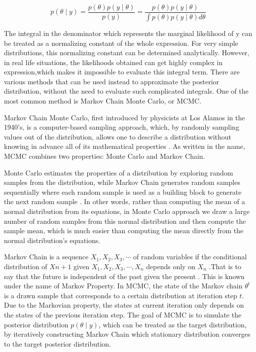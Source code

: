 \documentclass{usiinftr}
\begin{document}
\begin{equation} \label{Bayes}
p(\theta \mid y) = \frac{p(\theta)p(y \mid \theta)}{p(y)} = \frac{p(\theta)p(y \mid \theta)}{\int p(\theta)p(y \mid \theta) d\theta}
\end{equation}

The integral in the denominator which represents the marginal likelihood of y can be treated as a normalizing constant of the whole expression. For very simple distributions, this normalizing constant can be determined analytically. However, in real life situations, the likelihoods obtained can get highly complex in expression,which makes it impossible to evaluate this integral term. There are various methods that can be used instead to approximate the posterior distribution, without the need to evaluate such complicated integrals. One of the most common method is Markov Chain Monte Carlo, or MCMC.

Markov Chain Monte Carlo, first introduced by physicists at Los Alamos in the 1940's, is a computer-based sampling approach, which, by randomly sampling values out of the distribution, allows one to describe a distribution without knowing in advance all of its mathematical properties \cite{20}. As written in the name, MCMC combines two properties: Monte Carlo and Markov Chain. 

Monte Carlo estimates the properties of a distribution by exploring random samples from the distribution, while Markov Chain generates random samples sequentially where each random sample is used as a building block to generate the next random sample \cite{20}. In other words, rather than computing the mean of a normal distribution from its equations, in Monte Carlo approach we draw a large number of random samples from this normal distribution and then compute the sample mean, which is much easier than computing the mean directly from the normal distribution's equations.

Markov Chain is a sequence $X_1,X_2, X_3, \cdots$ of random variables if the conditional distribution of $X{n+1}$ given $X_1,X_2, X_3, \cdots, X_n$ depends only on $X_n$ \cite{21}.That is to say that the future is independent of the past given the present \cite{21}. This is known under the name of Markov Property. In MCMC, the state of the Markov chain $\theta^{t}$ is a drawn sample that corresponds to a certain distribution at iteration step $t$. Due to the Markovian property, the states at current iteration only depends on the states of the previous iteration step. The goal of MCMC is to simulate the posterior distribution $p(\theta \mid y)$, which can be treated as the target distribution, by iteratively constructing Markov Chain which stationary distribution converges to the target posterior distribution. 
\end{document}
